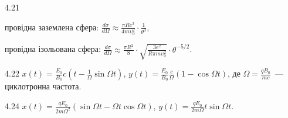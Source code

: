 \begin{Solution}{4.{21}}
	\begin{enumerate*}[label=\alph*)]
		\item провідна заземлена сфера: $\frac{d\sigma}{d\Omega} \approx \frac{\pi Re^2}{4mυ_0^2} \cdot \frac{1}{\theta ^3}$,
		\item провідна ізольована сфера: $\frac{d\sigma}{d\Omega} \approx \frac{\pi R^2}{8} \cdot \sqrt {\frac{3e^2}{R\pi mυ_0^2}}\cdot\theta^{-5/2}$.
	\end{enumerate*}
\end{Solution}
\begin{Solution}{4.{22}}
	$x(t)  = \frac{E_0}{B_0}c\left( t - \frac{1}{\Omega}\sin\Omega t \right) $,
	$y(t)  = \frac{E_0}{B_0} \frac{c}{\Omega}\left( 1 - \cos\Omega t \right) $, де $\Omega = \frac{qB_0}{mc}$~--- циклотронна частота.
\end{Solution}
\begin{Solution}{4.{24}}
	$x(t)  = \frac{qE_0}{2m\Omega^2}\left( \sin\Omega t - \Omega t\cos\Omega t \right) $,
	$y(t)  = \frac{qE_0}{2m\Omega}t\sin\Omega t$.
\end{Solution}

